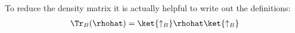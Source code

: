 To reduce the density matrix it is actually helpful to write out the definitions:
\begin{align}
\Tr_B(\rhohat) = \ket{\uparrow_B}\rhohat\ket{\uparrow_B}
\end{align}
